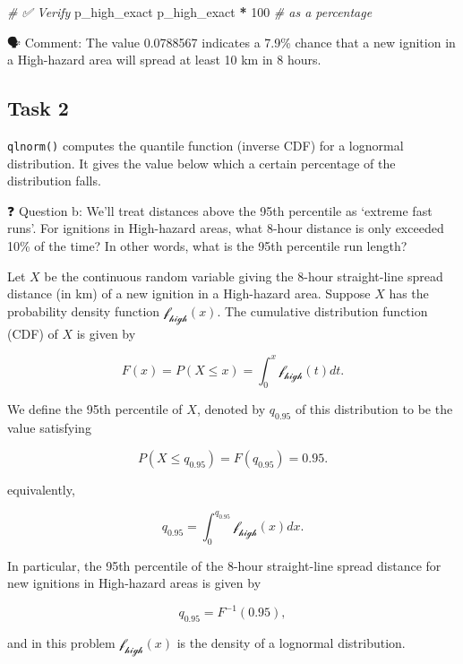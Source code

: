 \documentclass[
  12pt,
]{scrreprt}
\newenvironment{Shaded}{\begin{snugshade}}{\end{snugshade}}
\newcommand{\CommentTok}[1]{\textcolor[rgb]{0.56,0.35,0.01}{\textit{#1}}}
\newcommand{\DecValTok}[1]{\textcolor[rgb]{0.00,0.00,0.81}{#1}}
\newcommand{\NormalTok}[1]{#1}
\newcommand{\SpecialCharTok}[1]{\textcolor[rgb]{0.81,0.36,0.00}{\textbf{#1}}}
\begin{document}
\begin{Shaded}
\begin{Highlighting}[]
\CommentTok{\# ✅  Verify}
\NormalTok{p\_high\_exact}
\NormalTok{p\_high\_exact }\SpecialCharTok{*} \DecValTok{100}  \CommentTok{\# as a percentage}
\end{Highlighting}
\end{Shaded}

🗣 Comment: The value 0.0788567 indicates a 7.9\% chance that a new ignition in a High-hazard area will spread at least 10 km in 8 hours.

\subsection{Task 2}\label{task-2-1}

\texttt{qlnorm()} computes the quantile function (inverse CDF) for a lognormal distribution. It gives the value below which a certain percentage of the distribution falls.

❓ Question b: We'll treat distances above the 95th percentile as `extreme fast runs'. For ignitions in High-hazard areas, what 8-hour distance is only exceeded 10\% of the time? In other words, what is the 95th percentile run length?

\begin{customtextbox}
  
Let $X$ be the continuous random variable giving the 8-hour straight-line spread distance (in km) of a new ignition in a High-hazard area. Suppose $X$ has the probability density function $\mathcal{f_{high}}(x)$. The cumulative distribution function (CDF) of $X$ is given by

$$ F(x) = P(X \leq x) = \int_{0}^{x} \mathcal{f_{high}}(t) dt. $$

We define the 95th percentile of $X$, denoted by $q_{0.95}$ of this distribution to be the value satisfying

$$ P(X \leq q_{0.95}) = F(q_{0.95}) = 0.95. $$

equivalently, 

$$ q_{0.95} = \int_{0}^{q_{0.95}} \mathcal{f_{high}}(x) dx. $$

In particular, the 95th percentile of the 8-hour straight-line spread distance for new ignitions in High-hazard areas is given by 

$$ q_{0.95} = F^{-1}(0.95), $$ 

and in this problem $\mathcal{f_{high}}(x)$ is the density of a lognormal distribution.

\end{customtextbox}
\end{document}
